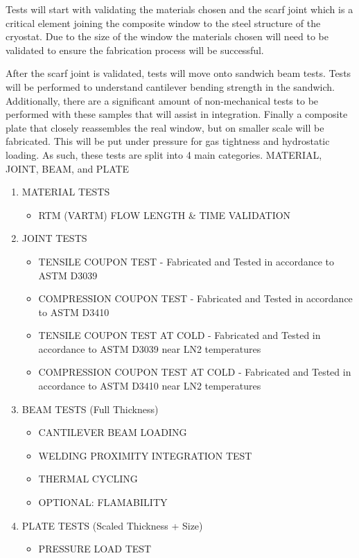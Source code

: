 Tests will start with validating the materials chosen and the scarf joint which is a critical element
joining the composite window to the steel structure of the cryostat. Due to the size of the window the
materials chosen will need to be validated to ensure the fabrication process will be successful.

After the scarf joint is validated, tests will move onto sandwich beam tests. Tests will be performed
to understand cantilever bending strength in the sandwich. Additionally, there are a significant
amount of non-mechanical tests to be performed with these samples that will assist in integration.
Finally a composite plate that closely reassembles the real window, but on smaller scale will be
fabricated. This will be put under pressure for gas tightness and hydrostatic loading.
As such, these tests are split into 4 main categories. MATERIAL, JOINT, BEAM, and PLATE

\begin{enumerate}
    \item MATERIAL TESTS
    \begin{itemize}
        \item RTM (VARTM) FLOW LENGTH \& TIME VALIDATION
    \end{itemize}
    \item JOINT TESTS
    \begin{itemize}
        \item TENSILE COUPON TEST - Fabricated and Tested in accordance to ASTM D3039
        \item COMPRESSION COUPON TEST - Fabricated and Tested in accordance to ASTM D3410
        \item TENSILE COUPON TEST AT COLD - Fabricated and Tested in accordance to ASTM D3039 near LN2 temperatures
        \item COMPRESSION COUPON TEST AT COLD - Fabricated and Tested in accordance to ASTM D3410 near LN2 temperatures
    \end{itemize}
    \item BEAM TESTS (Full Thickness)
    \begin{itemize}
        \item CANTILEVER BEAM LOADING
        \item WELDING PROXIMITY INTEGRATION TEST
        \item THERMAL CYCLING
        \item OPTIONAL: FLAMABILITY
    \end{itemize}
    \item PLATE TESTS (Scaled Thickness + Size)
    \begin{itemize}
        \item PRESSURE LOAD TEST
    \end{itemize}
\end{enumerate}

